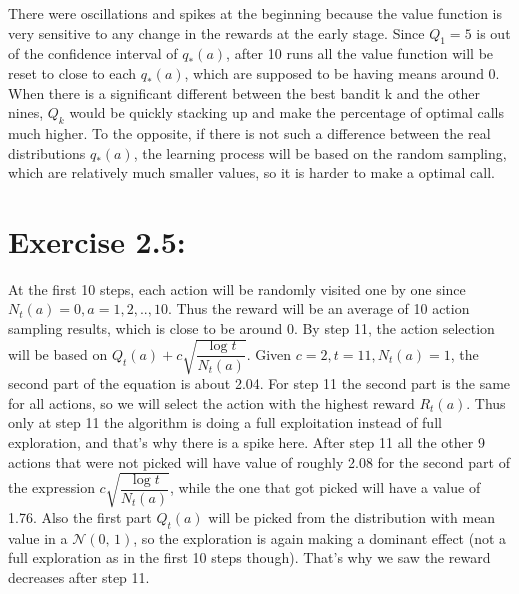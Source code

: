 \documentclass[10pt,letterpaper]{article}
\begin{document}
There were oscillations and spikes at the beginning because the value function is very sensitive to any change in the rewards at the early stage. Since $Q_1=5$ is out of the confidence interval of $q_*(a)$, after 10 runs all the value function will be reset to close to each $q_*(a)$, which are supposed to be having means around 0. When there is a significant different between the best bandit k and the other nines, $Q_k$ would be quickly stacking up and make the percentage of optimal calls much higher. To the opposite, if there is not such a difference between the real distributions $q_*(a)$, the learning process will be based on the random sampling, which are relatively much smaller values, so it is harder to make a optimal call.

\section*{Exercise 2.5: }
\label{2.5}

At the first 10 steps, each action will be randomly visited one by one since $N_t(a)=0, a=1,2,..,10$. Thus the reward will be an average of 10 action sampling results, which is close to be around 0. By step 11, the action selection will be based on $Q_t(a)+c\sqrt{\dfrac{\log t}{N_t(a)}}$. Given $c=2, t=11, N_t(a)=1$, the second part of the equation is about 2.04. For step 11 the second part is the same for all actions, so we will select the action with the highest reward $R_t(a)$. Thus only at step 11 the algorithm is doing a full exploitation instead of full exploration, and that's why there is a spike here. After step 11 all the other 9 actions that were not picked will have value of roughly 2.08 for the second part of the expression $c\sqrt{\dfrac{\log t}{N_t(a)}}$, while the one that got picked will have a value of 1.76. Also the first part $Q_t(a)$ will be picked from the distribution with mean value in a $\mathcal{N}(0,\,1)$, so the exploration is again making a dominant effect (not a full exploration as in the first 10 steps though). That's why we saw the reward decreases after step 11.
\clearpage
\end{document}
